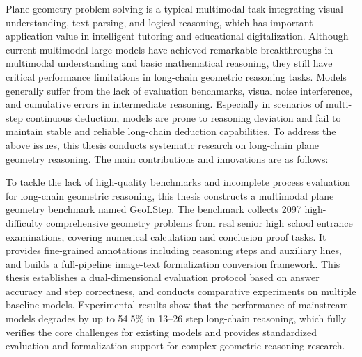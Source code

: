 
\begin{englishabstract}

    Plane geometry problem solving is a typical multimodal task integrating visual understanding, text parsing, and logical reasoning, which has important application value in intelligent tutoring and educational digitalization. Although current multimodal large models have achieved remarkable breakthroughs in multimodal understanding and basic mathematical reasoning, they still have critical performance limitations in long-chain geometric reasoning tasks. Models generally suffer from the lack of evaluation benchmarks, visual noise interference, and cumulative errors in intermediate reasoning. Especially in scenarios of multi-step continuous deduction, models are prone to reasoning deviation and fail to maintain stable and reliable long-chain deduction capabilities. To address the above issues, this thesis conducts systematic research on long-chain plane geometry reasoning. The main contributions and innovations are as follows:

    To tackle the lack of high-quality benchmarks and incomplete process evaluation for long-chain geometric reasoning, this thesis constructs a multimodal plane geometry benchmark named GeoLStep. The benchmark collects 2097 high-difficulty comprehensive geometry problems from real senior high school entrance examinations, covering numerical calculation and conclusion proof tasks. It provides fine-grained annotations including reasoning steps and auxiliary lines, and builds a full-pipeline image-text formalization conversion framework. This thesis establishes a dual-dimensional evaluation protocol based on answer accuracy and step correctness, and conducts comparative experiments on multiple baseline models. Experimental results show that the performance of mainstream models degrades by up to 54.5\% in 13--26 step long-chain reasoning, which fully verifies the core challenges for existing models and provides standardized evaluation and formalization support for complex geometric reasoning research.


\end{englishabstract}
